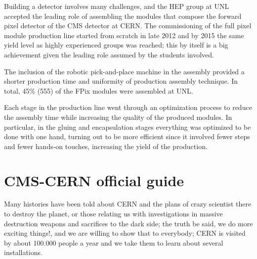 Building a detector involves many challenges, and the HEP group at UNL accepted the leading role of assembling the modules that compose the forward pixel detector of the CMS detector at CERN. The commissioning of the full pixel module production line started from scratch in late 2012 and by 2015 the same yield level as highly experienced groups was reached; this by itself is a big achievement given the leading role assumed by the students involved. %

The inclusion of the robotic pick-and-place machine in the assembly provided a shorter production time and uniformity of production assembly technique. In total, 45\% (555) of the FPix modules were assembled at UNL.  

Each stage in the production line went through an optimization process to reduce the assembly time while increasing the quality of the produced modules. In particular, in the gluing and encapsulation stages everything was optimized to be done with one hand, turning out to be more efficient since it involved fewer steps and fewer hands-on touches, increasing the yield of the production.

\clearpage

\section*{CMS-CERN official guide}
\small
Many histories have been told about CERN and the plans of crazy scientist there to destroy the planet, or those relating us with investigations in massive destruction weapons and sacrifices to the dark side; the truth be said, we do more exciting things!, and we are willing to show that to everybody; CERN is visited by about 100.000 people a year and we take them to learn about several installations.

